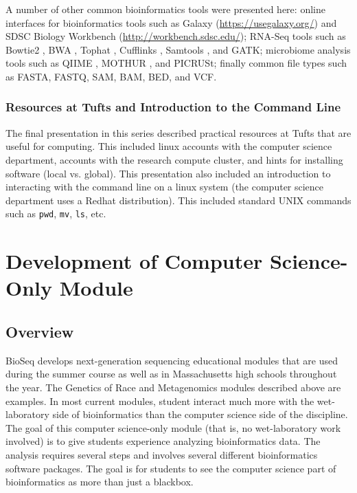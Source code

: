 \documentclass{report}
\begin{document}
A number of other common bioinformatics tools were presented here: online interfaces for bioinformatics tools such as Galaxy (\url{https://usegalaxy.org/}) and SDSC Biology Workbench (\url{http://workbench.sdsc.edu/}); RNA-Seq tools such as Bowtie2 \cite{langmead2012fast}, BWA \cite{li2009fast}, Tophat \cite{trapnell2009tophat}, Cufflinks \cite{trapnell2012differential}, Samtools \cite{li2009sequence}, and GATK; microbiome analysis tools such as QIIME \cite{caporaso2010qiime}, MOTHUR \cite{schloss2009introducing}, and PICRUSt; finally common file types such as FASTA, FASTQ, SAM, BAM, BED, and VCF.

\subsection{Resources at Tufts and Introduction to the Command Line}
The final presentation in this series described practical resources at Tufts that are useful for computing. This included linux accounts with the computer science department, accounts with the research compute cluster, and hints for installing software (local vs. global). This presentation also included an introduction to interacting with the command line on a linux system (the computer science department uses a Redhat distribution). This included standard UNIX commands such as \texttt{pwd}, \texttt{mv}, \texttt{ls}, etc.


\chapter{Development of Computer Science-Only Module}
\section{Overview}
BioSeq develops next-generation sequencing educational modules that are used during the summer course as well as in  Massachusetts high schools throughout the year. The Genetics of Race and Metagenomics modules described above are examples. In most current modules, student interact much more with the wet-laboratory side of bioinformatics than the computer science side of the discipline. The goal of this computer science-only module (that is, no wet-laboratory work involved) is to give students experience analyzing bioinformatics data. The analysis requires several steps and involves several different bioinformatics software packages. The goal is for students to see the computer science part of bioinformatics as more than just a blackbox.
\end{document}
